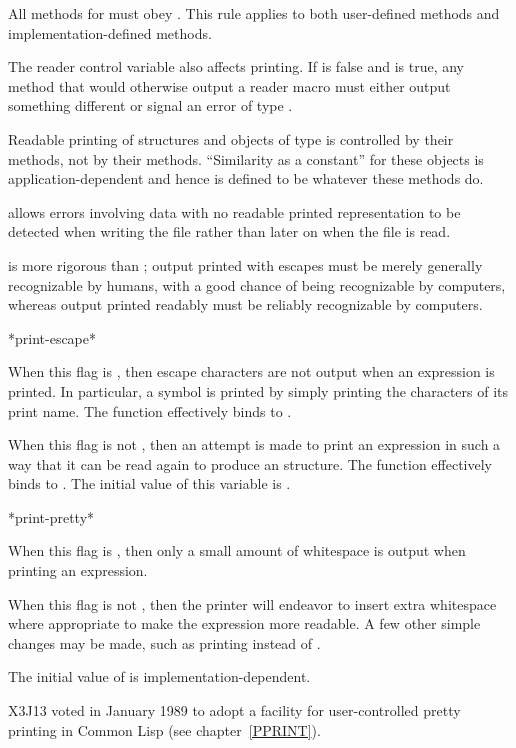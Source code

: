 \begin{defun}[Variable]
  All methods for  must obey .  This
  rule applies to both user-defined methods and implementation-defined methods.

  The reader control variable  also affects printing.
  If  is false and  is true, any 
  method that would otherwise output a  reader macro must either output something
  different or signal an error of type .

  Readable printing of structures and objects of type 
  is controlled
  by their  methods, not by their  methods.
  ``Similarity as a constant'' for these objects is application-dependent
  and hence is defined to be whatever these methods do.

   allows errors involving data with no
  readable printed representation to be detected when writing the file rather than
  later on when the file is read.

   is more rigorous than ; output printed
  with escapes must be merely generally recognizable by humans, with a good chance
  of being recognizable by computers, whereas
  output printed readably must be reliably recognizable by computers.
\end{defun}

\begin{defun}[Variable]
*print-escape*

When this flag is {\false}, then escape characters are not output
when an expression is printed.  In particular, a symbol is printed
by simply printing the characters of its print name.
The function  effectively binds  to {\false}.

When this flag is not {\false}, then an attempt is made to print an
expression in such a way that it can be read again to produce an
 structure.
The function  effectively binds  to {\true}.
The initial value of this variable is {\true}.
\end{defun}

\begin{defun}[Variable]
*print-pretty*

When this flag is {\false}, then only a small amount of whitespace is
output when printing an expression.

When this flag is not {\false}, then the printer will endeavor to insert
extra whitespace where appropriate to make the expression more readable.
A few other simple changes may be made, such as printing 
instead of .

The initial value of  is implementation-dependent.

\begin{new}
X3J13 voted in January 1989
to adopt a facility for user-controlled pretty printing
in Common Lisp
(see chapter~\ref{PPRINT}).
\end{new}
\end{defun}

